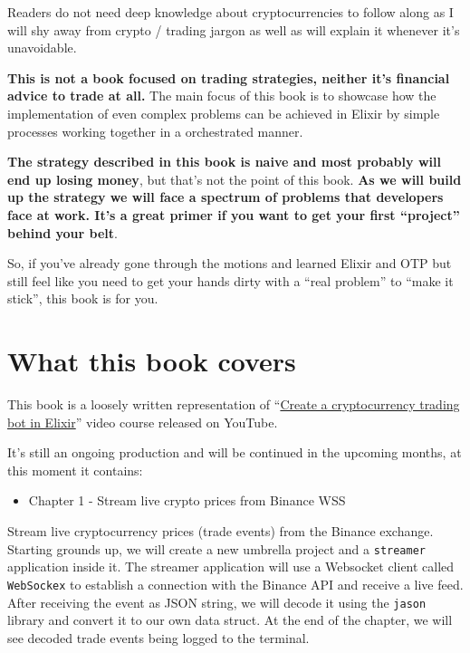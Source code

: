 \documentclass[
  oneside]{book}
\providecommand{\tightlist}{%
  \setlength{\itemsep}{0pt}\setlength{\parskip}{0pt}}
\begin{document}
Readers do not need deep knowledge about cryptocurrencies to follow along as I will shy away from crypto / trading jargon as well as will explain it whenever it's unavoidable.

\textbf{This is not a book focused on trading strategies, neither it's financial advice to trade at all.} The main focus of this book is to showcase how the implementation of even complex problems can be achieved in Elixir by simple processes working together in a orchestrated manner.

\textbf{The strategy described in this book is naive and most probably will end up losing money}, but that's not the point of this book. \textbf{As we will build up the strategy we will face a spectrum of problems that developers face at work. It's a great primer if you want to get your first ``project'' behind your belt}.

So, if you've already gone through the motions and learned Elixir and OTP but still feel like you need to get your hands dirty with a ``real problem'' to ``make it stick'', this book is for you.

\hypertarget{what-this-book-covers}{%
\section*{What this book covers}\label{what-this-book-covers}}

This book is a loosely written representation of ``\href{https://www.youtube.com/watch?v=wVYIx7M6o28\&list=PLxsE19GnjC5Nv1CbeKOiS5YqGqw35aZFJ}{Create a cryptocurrency trading bot in Elixir}'' video course released on YouTube.

It's still an ongoing production and will be continued in the upcoming months, at this moment it contains:

\begin{itemize}
\tightlist
\item
  Chapter 1 - Stream live crypto prices from Binance WSS
\end{itemize}

Stream live cryptocurrency prices (trade events) from the Binance exchange. Starting grounds up, we will create a new umbrella project and a \texttt{streamer} application inside it. The streamer application will use a Websocket client called \texttt{WebSockex} to establish a connection with the Binance API and receive a live feed. After receiving the event as JSON string, we will decode it using the \texttt{jason} library and convert it to our own data struct. At the end of the chapter, we will see decoded trade events being logged to the terminal.
\end{document}
